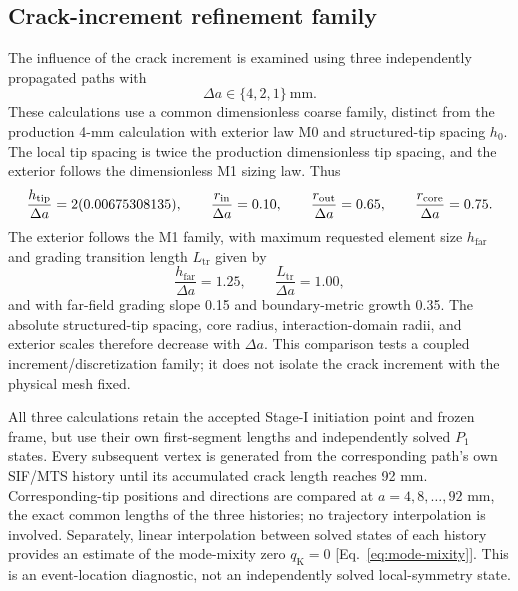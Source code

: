 \documentclass[pdflatex,sn-mathphys-num]{sn-jnl}
\begin{document}
\subsection{Crack-increment refinement family}
The influence of the crack increment is examined using
three independently propagated paths with
\[
 \Delta a\in\{4,2,1\}\ \mathrm{mm}.
\]
These calculations use a common dimensionless coarse family,
distinct from the production 4-mm calculation with exterior law M0
and structured-tip spacing $h_0$. The local tip spacing is twice
the production dimensionless tip spacing, and the exterior follows
the dimensionless M1 sizing law. Thus
\begin{equation}
 \frac{h_{\rm tip}}{\Delta a}
 =2(0.00675308135),\qquad
 \frac{r_{\mathrm{in}}}{\Delta a}=0.10,\qquad
 \frac{r_{\mathrm{out}}}{\Delta a}=0.65,\qquad
 \frac{r_{\mathrm{core}}}{\Delta a}=0.75.
 \label{eq:increment-family}
\end{equation}
The exterior follows the M1 family, with maximum requested
element size $h_{\mathrm{far}}$ and grading transition length
$L_{\mathrm{tr}}$ given by
\[
 \frac{h_{\mathrm{far}}}{\Delta a}=1.25,\qquad
 \frac{L_{\mathrm{tr}}}{\Delta a}=1.00,
\]
and with far-field grading slope 0.15 and boundary-metric
growth 0.35. The absolute structured-tip spacing, core
radius, interaction-domain radii, and exterior scales
therefore decrease with $\Delta a$. This comparison tests a
coupled increment/discretization family; it does not isolate
the crack increment with the physical mesh fixed.

All three calculations retain the accepted Stage-I initiation point
and frozen frame, but use their own first-segment lengths and
independently solved $P_1$ states. Every subsequent vertex is
generated from the corresponding path's own SIF/MTS history
until its accumulated crack length reaches 92 mm.
Corresponding-tip positions and directions are compared at
$a=4,8,\ldots,92$ mm, the exact common lengths of the three
histories; no trajectory interpolation is involved. Separately,
linear interpolation between solved states of each history provides
an estimate of the mode-mixity zero
$q_{\mathrm{K}}=0$ [Eq.~\eqref{eq:mode-mixity}]. This is an
event-location diagnostic, not an independently solved
local-symmetry state.
\end{document}

